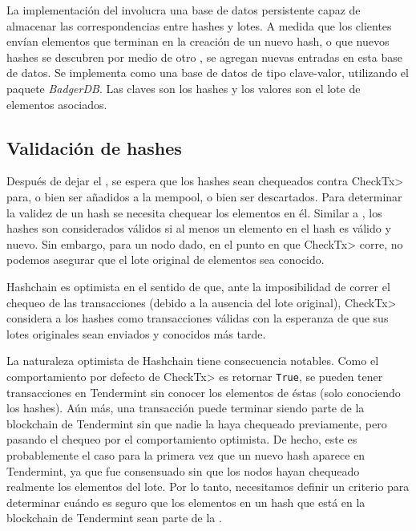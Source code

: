 La implementación del \hcollector involucra una base de datos persistente capaz de almacenar
las correspondencias entre hashes y lotes.
%
%
A medida que los clientes envían elementos que terminan en la creación de un nuevo hash, o que nuevos hashes se descubren
por medio de otro \hcollector, se agregan nuevas entradas en esta base de datos.
%
Se implementa como una base de datos de tipo clave-valor, utilizando el paquete
\textit{BadgerDB}.
%
Las claves son los hashes y los valores son el lote de elementos asociados.

\subsection{Validación de hashes}

Después de dejar el \hcollector, se espera que los hashes sean chequeados contra \<CheckTx>
para, o bien ser añadidos a la mempool, o bien ser descartados.
%
Para determinar la validez de un hash se necesita chequear los elementos en él. Similar a
\compresschain, los hashes son considerados válidos si al menos un elemento
en el hash es válido y nuevo.
%
Sin embargo, para un nodo dado, en el punto en que \<CheckTx> corre, no podemos asegurar que el
lote original de elementos sea conocido.

%
Hashchain es optimista en el sentido de que, ante la imposibilidad de correr el chequeo
de las transacciones (debido a la ausencia del lote original), \<CheckTx> considera a los
hashes como transacciones válidas con la esperanza de que sus lotes originales sean enviados
y conocidos más tarde. 

%
La naturaleza optimista de Hashchain tiene consecuencia notables.
%
Como el comportamiento por defecto de  \<CheckTx> es retornar \texttt{True},
se pueden tener transacciones en Tendermint sin conocer los elementos de éstas
(solo conociendo los hashes).
%
Aún más, una transacción puede terminar siendo parte de la blockchain de Tendermint sin que nadie
la haya chequeado previamente, pero pasando el chequeo por el comportamiento optimista.
%
De hecho, este es probablemente el caso para la primera vez que un nuevo hash aparece
en Tendermint, ya que fue consensuado sin que los nodos hayan chequeado realmente los elementos
del lote.
%
Por lo tanto, necesitamos definir un criterio para determinar cuándo es seguro
que los elementos en un hash que está en la blockchain de Tendermint sean parte de la \setchain.

